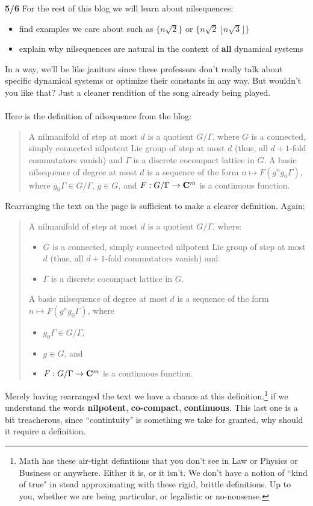\documentclass[12pt]{article}
\begin{document}
\noindent \textbf{5/6} For the rest of this blog we will learn about nilsequences:
\begin{itemize}
\item find examples we care about such as $\{ n \sqrt{2}\}$ or $ \{ n \sqrt{2} \, \lfloor n \sqrt{3}\rfloor \} $
\item explain why nilsequences are natural in the context of \textbf{all} dynamical systems
\end{itemize}
In a way, we'll be like janitors since these professors don't really talk about specific dynamical systems or optimize their constants in any way.  But wouldn't you like that?  Just a cleaner rendition of the song already being played. \\ \\
Here is the definition of nilsequence from the blog:
\begin{quotation}
\noindent A nilmanifold of step at most ${d}$ is a quotient ${G/\Gamma}$, where ${G}$ is a connected, simply connected nilpotent Lie group of step at most ${d}$ (thus, all ${d+1}$-fold commutators vanish) and ${\Gamma}$ is a discrete cocompact lattice in ${G}$. A basic nilsequence of degree at most ${d}$ is a sequence of the form ${n \mapsto F(g^n g_0 \Gamma)}$, where ${g_0 \Gamma \in G/\Gamma}$, ${g \in G}$, and ${F: G/\Gamma \rightarrow {\bf C}^m}$ is a continuous function.
\end{quotation}
Rearranging the text on the page is sufficient to make a clearer definition.  Again:
\begin{quotation}
\noindent A nilmanifold of step at most ${d}$ is a quotient ${G/\Gamma}$, where:
\begin{itemize}
\item ${G}$ is a connected, simply connected nilpotent Lie group of step at most ${d}$ (thus, all ${d+1}$-fold commutators vanish) and 
\item ${\Gamma}$ is a discrete cocompact lattice in ${G}$.
\end{itemize}
A basic nilsequence of degree at most ${d}$ is a sequence of the form ${n \mapsto F(g^n g_0 \Gamma)}$, where 
\begin{itemize}
\item ${g_0 \Gamma \in G/\Gamma}$, 
\item ${g \in G}$, and 
\item ${F: G/\Gamma \rightarrow {\bf C}^m}$ is a continuous function.
\end{itemize}
\end{quotation}
Merely having rearranged the text we have a chance at this definition.\footnote{Math has these air-tight defintiions that you don't see in Law or Physics or Business or anywhere.  Either it is, or it isn't.  We don't have a notion of ``kind of true" in stead approximating with these rigid, brittle definitions.  Up to you, whether we are being particular, or legalistic or no-nonsense.} if we understand the words \textbf{nilpotent}, \textbf{co-compact}, \textbf{continuous}.  This last one is a bit treacherous, since ``contintuity" is something we take for granted, why should it require a definition.
\end{document}
